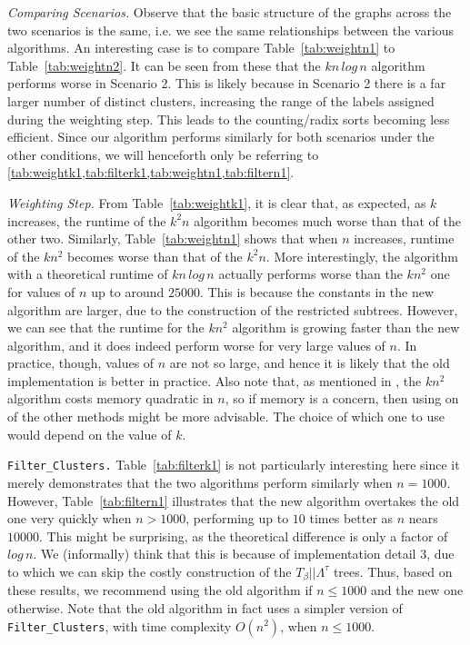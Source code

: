 \documentclass[12pt,a4paper]{article}
\newcommand{\leafset}{\Lambda}
\newcommand{\TB}{T_\beta}
\begin{document}
    \textit{Comparing Scenarios.} Observe that the basic structure of the graphs across the two scenarios is the same, i.e. we see the same relationships between the various algorithms. An interesting case is to compare Table~\ref{tab:weightn1} to Table~\ref{tab:weightn2}. It can be seen from these that the $kn\,log\,n$ algorithm performs worse in Scenario 2. This is likely because in Scenario 2 there is a far larger number of distinct clusters, increasing the range of the labels assigned during the weighting step. This leads to the counting/radix sorts becoming less efficient. Since our algorithm performs similarly for both scenarios under the other conditions, we will henceforth only be referring to \cref{tab:weightk1,tab:filterk1,tab:weightn1,tab:filtern1}.

    \textit{Weighting Step.} From Table~\ref{tab:weightk1}, it is clear that, as expected, as $k$ increases, the runtime of the $k^2n$ algorithm becomes much worse than that of the other two. Similarly, Table~\ref{tab:weightn1} shows that when $n$ increases, runtime of the $kn^2$ becomes worse than that of the $k^2n$. More interestingly, the algorithm with a theoretical runtime of $kn\,log\,n$ actually performs worse than the $kn^2$ one for values of $n$ up to around $25000$. This is because the constants in the new algorithm are larger, due to the construction of the restricted subtrees. However, we can see that the runtime for the $kn^2$ algorithm is growing faster than the new algorithm, and it does indeed perform worse for very large values of $n$. In practice, though, values of $n$ are not so large, and hence it is likely that the old implementation is better in practice. Also note that, as mentioned in \cite{jansson2018algorithms}, the $kn^2$ algorithm costs memory quadratic in $n$, so if memory is a concern, then using on of the other methods might be more advisable. The choice of which one to use would depend on the value of $k$.

    \texttt{Filter\_Clusters.} Table~\ref{tab:filterk1} is not particularly interesting here since it merely demonstrates that the two algorithms perform similarly when $n = 1000$. However, Table~\ref{tab:filtern1} illustrates that the new algorithm overtakes the old one very quickly when $n > 1000$, performing up to $10$ times better as $n$ nears $10000$. This might be surprising, as the theoretical difference is only a factor of $log\,n$. We (informally) think that this is because of implementation detail 3, due to which we can skip the costly construction of the $\TB||\leafset^{\tau}$ trees. Thus, based on these results, we recommend using the old algorithm if $n \leq 1000$ and the new one otherwise. Note that the old algorithm in fact uses a simpler version of \texttt{Filter\_Clusters}, with time complexity $O(n^2)$, when $n \leq 1000$.
\end{document}
